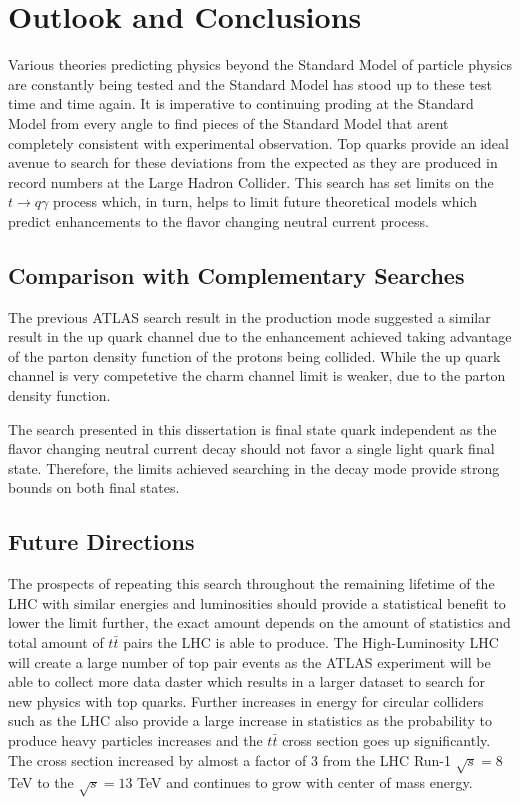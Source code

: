 
\chapter{Outlook and Conclusions}
\label{ch:Conclusion}
Various theories predicting physics beyond the Standard Model of particle physics are constantly being tested and the Standard Model has stood up to these test time and time again.  It is imperative to continuing proding at the Standard Model from every angle to find pieces of the Standard Model that arent completely consistent with experimental observation.  Top quarks provide an ideal avenue to search for these deviations from the expected as they are produced in record numbers at the Large Hadron Collider.  This search has set limits on the $t\rightarrow q \gamma$ process which, in turn, helps to limit future theoretical models which predict enhancements to the flavor changing neutral current process.

\section{Comparison with Complementary Searches}

The previous ATLAS search result in the production mode \cite{GregorFCNC} suggested a similar result in the up quark channel due to the enhancement achieved taking advantage of the parton density function of the protons being collided.  While the up quark channel is very competetive the charm channel limit is weaker, due to the parton density function.  

The search presented in this dissertation is final state quark independent as the flavor changing neutral current decay should not favor a single light quark final state.  Therefore, the limits achieved searching in the decay mode provide strong bounds on both final states. 

\section{Future Directions}
The prospects of repeating this search throughout the remaining lifetime of the LHC with similar energies and luminosities should provide a statistical benefit to lower the limit further, the exact amount depends on the amount of statistics and total amount of $t\bar{t}$ pairs the LHC is able to produce.  The High-Luminosity LHC will create a large number of top pair events as the ATLAS experiment will be able to collect more data daster which results in a larger dataset to search for new physics with top quarks.  Further increases in energy for circular colliders such as the LHC also provide a large increase in statistics as the probability to produce heavy particles increases and the $t\bar{t}$ cross section goes up significantly.  The cross section increased by almost a factor of 3 from the LHC Run-1 $\sqrt{s}=8$ TeV to the $\sqrt{s}=13$ TeV and continues to grow with center of mass energy.

